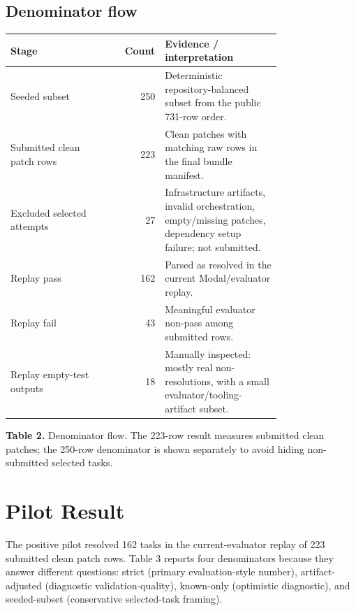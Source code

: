 \documentclass[11pt]{article}
\begin{document}
\subsection{Denominator flow}
\begin{center}
\begin{tabular}{p{0.34\linewidth}rp{0.43\linewidth}}
\toprule
Stage & Count & Evidence / interpretation \\
\midrule
Seeded subset & 250 & Deterministic repository-balanced subset from the public 731-row order. \\
Submitted clean patch rows & 223 & Clean patches with matching raw rows in the final bundle manifest. \\
Excluded selected attempts & 27 & Infrastructure artifacts, invalid orchestration, empty/missing patches, dependency setup failure; not submitted. \\
Replay pass & 162 & Parsed as resolved in the current Modal/evaluator replay. \\
Replay fail & 43 & Meaningful evaluator non-pass among submitted rows. \\
Replay empty-test outputs & 18 & Manually inspected: mostly real non-resolutions, with a small evaluator/tooling-artifact subset. \\
\bottomrule
\end{tabular}
\par\vspace{0.5em}
\small\textbf{Table 2.} Denominator flow. The 223-row result measures submitted clean patches; the 250-row denominator is shown separately to avoid hiding non-submitted selected tasks.
\end{center}

\section{Pilot Result}

The positive pilot resolved 162 tasks in the current-evaluator replay of 223 submitted clean patch rows. Table 3 reports four denominators because they answer different questions: strict (primary evaluation-style number), artifact-adjusted (diagnostic validation-quality), known-only (optimistic diagnostic), and seeded-subset (conservative selected-task framing).
\end{document}
